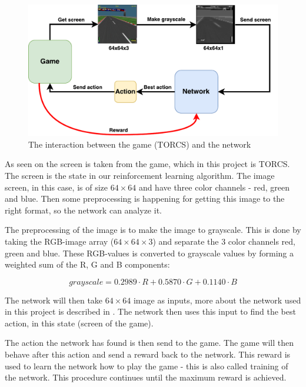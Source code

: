 \begin{figure}[H]
	\centering
	\includegraphics[width=1\textwidth]{Figures/Architecture/TORCS_interaction.pdf}
	\caption{The interaction between the game (TORCS) and the network }
	\label{fig:TORCS_interaction}
\end{figure}

 
As seen on  the screen is taken from the game, which in this project is TORCS. The screen is the state in our reinforcement learning algorithm. The image screen, in this case, is of size $64 \times 64$ and have three color channels - red, green and blue. Then some preprocessing is happening for getting this image to the right format, so the network can analyze it. 

The preprocessing of the image is to make the image to grayscale. This is done by taking the RGB-image array ($64 \times 64 \times 3$) and separate the 3 color channels red, green and blue. These RGB-values is converted to grayscale values by forming a weighted sum of the R, G and B components:

\begin{equation}
grayscale = 0.2989 \cdot R + 0.5870 \cdot G + 0.1140 \cdot B 
\end{equation}  

The network will then take $64 \times 64 $ image as inputs, more about the network used in this project is described in . The network then uses this input to find the best action, in this state (screen of the game). 

The action the network has found is then send to the game. The game will then behave after this action and send a reward back to the network. This reward is used to learn the network how to play the game - this is also called training of the network. This procedure continues until the maximum reward is achieved.   


 

 
   